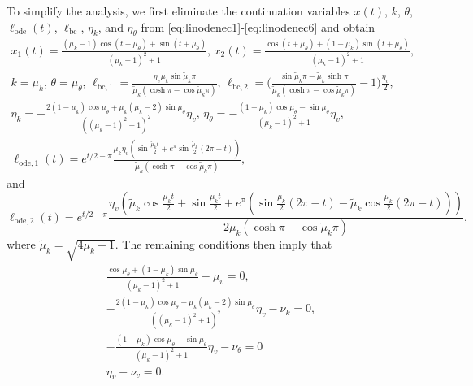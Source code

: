 To simplify the analysis, we first eliminate the continuation variables $x(t)$, $k$, $\theta$, $\ell_\mathrm{ode}(t)$, $\ell_\mathrm{bc}$, $\eta_k$, and $\eta_\theta$ from \eqref{eq:linodenec1}-\eqref{eq:linodenec6} and obtain
\begin{gather}
x_1(t)=\frac{(\mu_k-1)\cos(t+\mu_\theta)+\sin(t+\mu_\theta)}{(\mu_k-1)^2+1},\,x_2(t)=\frac{\cos(t+\mu_\theta)+(1-\mu_k)\sin(t+\mu_\theta)}{(\mu_k-1)^2+1},\\
k=\mu_k,\,\theta=\mu_\theta,\,\ell_{\mathrm{bc},1}=\frac{\eta_v\mu_k\sin\tilde{\mu}_k\pi}{\tilde{\mu}_k\left(\cosh\pi-\cos\tilde{\mu}_k\pi\right)},\,\ell_{\mathrm{bc},2}=\bigg(\frac{\sin\tilde{\mu}_k\pi-\tilde{\mu}_k\sinh\pi}{\tilde{\mu}_k\left(\cosh\pi-\cos\tilde{\mu}_k\pi\right)}-1\bigg)\frac{\eta_v}{2},\\
\eta_k=-\frac{2(1-\mu_k)\cos\mu_\theta+\mu_k(\mu_k-2)\sin\mu_\theta}{((\mu_k-1)^2+1)^2}\eta_v,\,\eta_\theta=-\frac{(1-\mu_k)\cos\mu_\theta-\sin\mu_\theta}{(\mu_k-1)^2+1}\eta_v,\\
\ell_{\mathrm{ode},1}(t)=e^{t/2-\pi}\frac{\mu_k\eta_v\left(\sin\frac{\tilde{\mu}_kt}{2}+e^\pi\sin\frac{\tilde{\mu}_k}{2}\left(2\pi-t\right)\right)}{\tilde{\mu}_k\left(\cosh\pi-\cos\tilde{\mu}_k\pi\right)},
\end{gather}
and
\begin{equation}
\ell_{\mathrm{ode},2}(t)=e^{t/2-\pi}\frac{\eta_v\left(\tilde{\mu}_k\cos\frac{\tilde{\mu}_kt}{2}+\sin\frac{\tilde{\mu}_kt}{2}+e^\pi\left(\sin\frac{\tilde{\mu}_k}{2}(2\pi-t)-\tilde{\mu}_k\cos\frac{\tilde{\mu}_k}{2}(2\pi-t)\right)\right)}{2\tilde{\mu}_k\left(\cosh\pi-\cos\tilde{\mu}_k\pi\right)},
\end{equation}
where $\tilde{\mu}_k=\sqrt{4\mu_k-1}$. The remaining conditions then imply that
\begin{gather}
\frac{\cos\mu_\theta+(1-\mu_k)\sin\mu_\theta}{(\mu_k-1)^2+1}-\mu_v=0,\\
-\frac{2(1-\mu_k)\cos\mu_\theta+\mu_k(\mu_k-2)\sin\mu_\theta}{((\mu_k-1)^2+1)^2}\eta_v-\nu_k=0,\\
-\frac{(1-\mu_k)\cos\mu_\theta-\sin\mu_\theta}{(\mu_k-1)^2+1}\eta_v-\nu_\theta=0\\\eta_v-\nu_v=0.
\end{gather}

